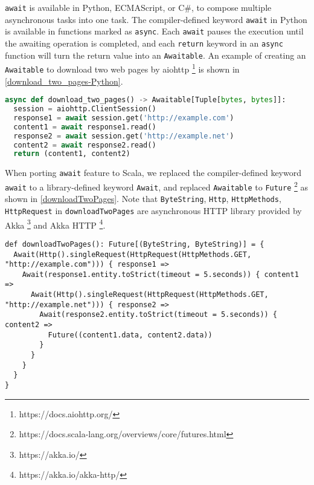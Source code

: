 \lstinline{await} is available in Python, ECMAScript, or C\#, to compose multiple asynchronous tasks into one task. The compiler-defined keyword \lstinline{await} in Python is available in functions marked as \lstinline{async}. Each \lstinline{await} pauses the execution until the awaiting operation is completed, and each \lstinline{return} keyword in an \lstinline{async} function will turn the return value into an \lstinline{Awaitable}. An example of creating an \lstinline{Awaitable} to download two web pages by aiohttp \footnote{https://docs.aiohttp.org/} is shown in \cref{download_two_pages-Python}.

\begin{lstlisting}[language=Python,style=Python3,caption={Asynchronously downloading two web pages in Python},label={download_two_pages-Python}]
async def download_two_pages() -> Awaitable[Tuple[bytes, bytes]]:
  session = aiohttp.ClientSession()
  response1 = await session.get('http://example.com')
  content1 = await response1.read()
  response2 = await session.get('http://example.net')
  content2 = await response2.read()
  return (content1, content2)
\end{lstlisting}

When porting \lstinline{await} feature to Scala, we replaced the compiler-defined keyword \lstinline{await} to a library-defined keyword \lstinline{Await}, and replaced \lstinline{Awaitable} to \lstinline{Future} \footnote{https://docs.scala-lang.org/overviews/core/futures.html} as shown in \cref{downloadTwoPages}. Note that \lstinline{ByteString}, \lstinline{Http}, \lstinline{HttpMethods}, \lstinline{HttpRequest} in \lstinline{downloadTwoPages} are asynchronous HTTP library provided by Akka \footnote{https://akka.io/} and Akka HTTP \footnote{https://akka.io/akka-http/}.

\begin{lstlisting}[caption={Asynchronously downloading two web pages in \textit{Dsl.scala} },label={downloadTwoPages}]
def downloadTwoPages(): Future[(ByteString, ByteString)] = {
  Await(Http().singleRequest(HttpRequest(HttpMethods.GET, "http://example.com"))) { response1 =>
    Await(response1.entity.toStrict(timeout = 5.seconds)) { content1 =>
      Await(Http().singleRequest(HttpRequest(HttpMethods.GET, "http://example.net"))) { response2 =>
        Await(response2.entity.toStrict(timeout = 5.seconds)) { content2 =>
          Future((content1.data, content2.data))
        }
      }
    }
  }
}
\end{lstlisting}


